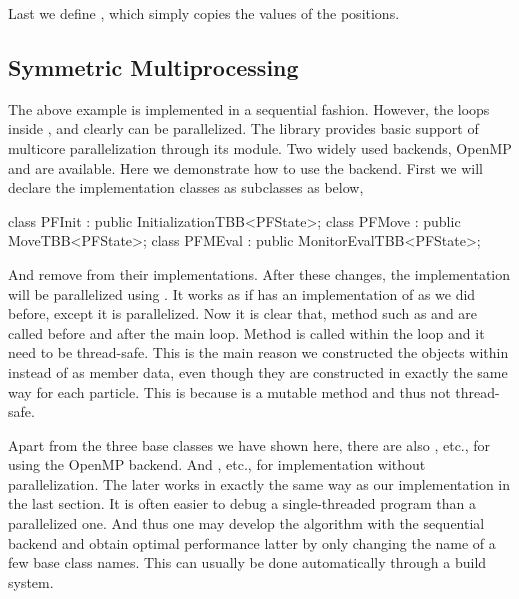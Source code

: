 \documentclass[11pt,bib,mint,hyper,altcolor]{marticle}
\begin{document}
Last we define , which simply copies the values of the
positions.

\subsection{Symmetric Multiprocessing}
\label{sub:Symmetric Multiprocessing}

The above example is implemented in a sequential fashion. However, the loops
inside ,  and  clearly
can be parallelized. The library provides basic support of multicore
parallelization through its \smp module. Two widely used backends, OpenMP and
\tbb are available. Here we demonstrate how to use the \tbb backend. First we
will declare the implementation classes as subclasses as below,
\begin{cppcode}
  class PFInit : public InitializationTBB<PFState>;
  class PFMove : public MoveTBB<PFState>;
  class PFMEval : public MonitorEvalTBB<PFState>;
\end{cppcode}
And remove  from their implementations. After these
changes, the implementation will be parallelized using \tbb. It works as if
 has an implementation of
 as we did before, except it is parallelized. Now it is
clear that, method such as  and  are
called before and after the main loop. Method  is called
within the loop and it need to be thread-safe. This is the main reason we
constructed the  objects within
 instead of as member data, even though they are constructed
in exactly the same way for each particle. This is because
 is a mutable method and thus not
thread-safe.

Apart from the three base classes we have shown here, there are also
, etc., for using the OpenMP backend. And
, etc., for implementation without
parallelization. The later works in exactly the same way as our implementation
in the last section. It is often easier to debug a single-threaded program than
a parallelized one. And thus one may develop the algorithm with the sequential
backend and obtain optimal performance latter by only changing the name of a
few base class names. This can usually be done automatically through a build
system.
\end{document}
